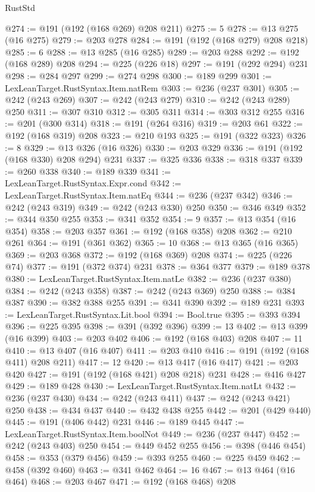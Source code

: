 \begin{lexlean}{RustStd}
\begin{coremodule}
@274 := @191 (@192 (@168 @269) @208 @211)
@275 := 5
@278 := @13 @275 (@16 @275)
@279 := @203 @278
@284 := @191 (@192 (@168 @279) @208 @218)
@285 := 6
@288 := @13 @285 (@16 @285)
@289 := @203 @288
@292 := @192 (@168 @289) @208
@294 := @225 (@226 @18)
@297 := @191 (@292 @294) @231
@298 := @284 @297
@299 := @274 @298
@300 := @189 @299
@301 := LexLeanTarget.RustSyntax.Item.natRem
@303 := @236 (@237 @301)
@305 := @242 (@243 @269)
@307 := @242 (@243 @279)
@310 := @242 (@243 @289) @250
@311 := @307 @310
@312 := @305 @311
@314 := @303 @312 @255
@316 := @201 (@300 @314)
@318 := @191 (@264 @316)
@319 := @203 @61
@322 := @192 (@168 @319) @208
@323 := @210 @193
@325 := @191 (@322 @323)
@326 := 8
@329 := @13 @326 (@16 @326)
@330 := @203 @329
@336 := @191 (@192 (@168 @330) @208 @294) @231
@337 := @325 @336
@338 := @318 @337
@339 := @260 @338
@340 := @189 @339
@341 := LexLeanTarget.RustSyntax.Expr.cond
@342 := LexLeanTarget.RustSyntax.Item.natEq
@344 := @236 (@237 @342)
@346 := @242 (@243 @319)
@349 := @242 (@243 @330) @250
@350 := @346 @349
@352 := @344 @350 @255
@353 := @341 @352
@354 := 9
@357 := @13 @354 (@16 @354)
@358 := @203 @357
@361 := @192 (@168 @358) @208
@362 := @210 @261
@364 := @191 (@361 @362)
@365 := 10
@368 := @13 @365 (@16 @365)
@369 := @203 @368
@372 := @192 (@168 @369) @208
@374 := @225 (@226 @74)
@377 := @191 (@372 @374) @231
@378 := @364 @377
@379 := @189 @378
@380 := LexLeanTarget.RustSyntax.Item.natLe
@382 := @236 (@237 @380)
@384 := @242 (@243 @358)
@387 := @242 (@243 @369) @250
@388 := @384 @387
@390 := @382 @388 @255
@391 := @341 @390
@392 := @189 @231
@393 := LexLeanTarget.RustSyntax.Lit.bool
@394 := Bool.true
@395 := @393 @394
@396 := @225 @395
@398 := @391 (@392 @396)
@399 := 13
@402 := @13 @399 (@16 @399)
@403 := @203 @402
@406 := @192 (@168 @403) @208
@407 := 11
@410 := @13 @407 (@16 @407)
@411 := @203 @410
@416 := @191 (@192 (@168 @411) @208 @211)
@417 := 12
@420 := @13 @417 (@16 @417)
@421 := @203 @420
@427 := @191 (@192 (@168 @421) @208 @218) @231
@428 := @416 @427
@429 := @189 @428
@430 := LexLeanTarget.RustSyntax.Item.natLt
@432 := @236 (@237 @430)
@434 := @242 (@243 @411)
@437 := @242 (@243 @421) @250
@438 := @434 @437
@440 := @432 @438 @255
@442 := @201 (@429 @440)
@445 := @191 (@406 @442) @231
@446 := @189 @445
@447 := LexLeanTarget.RustSyntax.Item.boolNot
@449 := @236 (@237 @447)
@452 := @242 (@243 @403) @250
@454 := @449 @452 @255
@456 := @398 (@446 @454)
@458 := @353 (@379 @456)
@459 := @393 @255
@460 := @225 @459
@462 := @458 (@392 @460)
@463 := @341 @462
@464 := 16
@467 := @13 @464 (@16 @464)
@468 := @203 @467
@471 := @192 (@168 @468) @208

\end{coremodule}
\end{lexlean}
